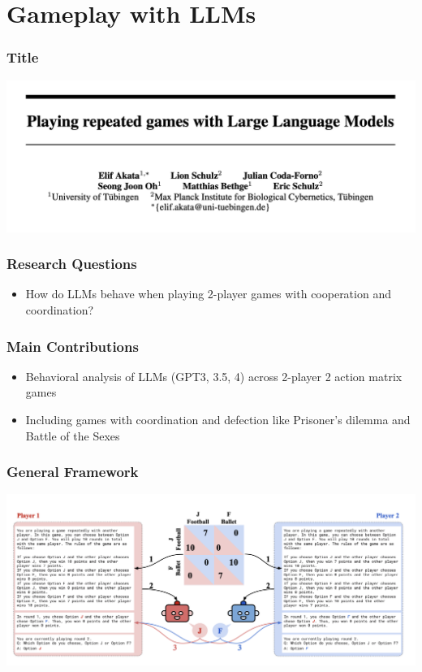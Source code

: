 \documentclass[xcolor=dvipsnames]{beamer}
\newcommand{\0}{\vec{0}}
\begin{document}
	\section{ Gameplay with LLMs}
	\begin{frame}
		\frametitle{Title}
		\begin{center}
			\includegraphics[width=\textwidth]{Akata0}
		\end{center}
	\end{frame}
	
	\begin{frame}
		\frametitle{Research Questions
		}
		\begin{itemize}
			\item How do LLMs behave when playing 2-player games with cooperation and coordination?
		\end{itemize}
	\end{frame}
	
	\begin{frame}
		\frametitle{Main Contributions
		}
		\begin{itemize}
			\item Behavioral analysis of LLMs (GPT3, 3.5, 4) across 2-player 2 action matrix games
			\item Including games with coordination and defection like Prisoner's dilemma and Battle of the Sexes
		\end{itemize}
	\end{frame}
	\begin{frame}
		\frametitle{General Framework}
		\begin{center}
			\includegraphics[width=\textwidth]{Akata1}
		\end{center}
	\end{frame}
	
\end{document}
